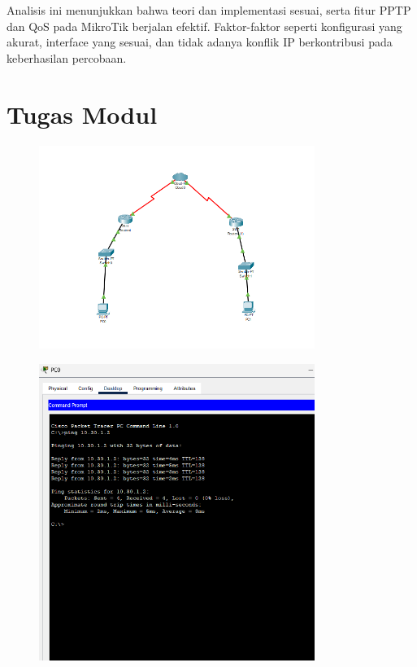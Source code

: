 Analisis ini menunjukkan bahwa teori dan implementasi sesuai, serta fitur PPTP dan QoS pada MikroTik berjalan efektif. Faktor-faktor seperti konfigurasi yang akurat, interface yang sesuai, dan tidak adanya konflik IP berkontribusi pada keberhasilan percobaan.

\section{Tugas Modul}
\begin{figure}[H]
\centering
\includegraphics[width=0.8\textwidth]{P1/img/Screenshot 2025-06-12 174011.png}
\end{figure}

\begin{figure}[H]
\centering
\includegraphics[width=0.8\textwidth]{P1/img/Screenshot 2025-06-12 175509.png}
\end{figure}

